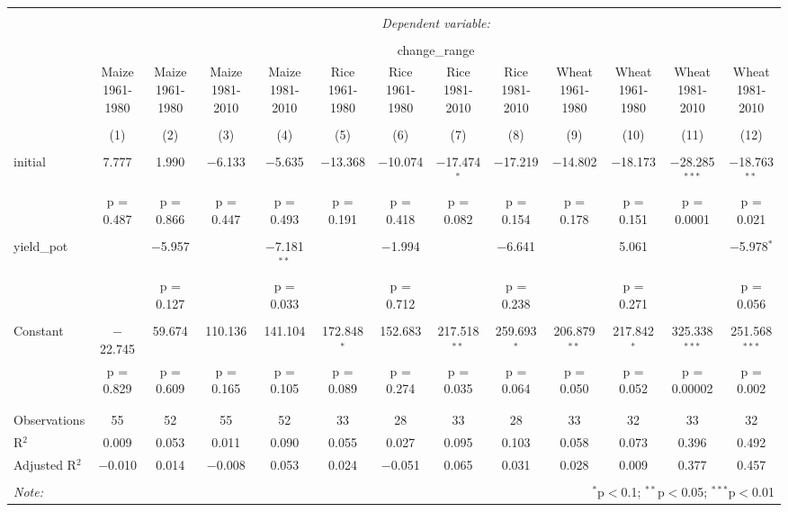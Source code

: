 
\begin{table}[!htbp] \centering 
  \caption{} 
  \label{} 
\begin{tabular}{@{\extracolsep{5pt}}lcccccccccccc} 
\\[-1.8ex]\hline 
\hline \\[-1.8ex] 
 & \multicolumn{12}{c}{\textit{Dependent variable:}} \\ 
\cline{2-13} 
\\[-1.8ex] & \multicolumn{12}{c}{change\_range} \\ 
 & Maize 1961-1980 & Maize 1961-1980 & Maize 1981-2010 & Maize 1981-2010 & Rice 1961-1980 & Rice 1961-1980 & Rice 1981-2010 & Rice 1981-2010 & Wheat 1961-1980 & Wheat 1961-1980 & Wheat 1981-2010 & Wheat 1981-2010 \\ 
\\[-1.8ex] & (1) & (2) & (3) & (4) & (5) & (6) & (7) & (8) & (9) & (10) & (11) & (12)\\ 
\hline \\[-1.8ex] 
 initial & 7.777 & 1.990 & $-$6.133 & $-$5.635 & $-$13.368 & $-$10.074 & $-$17.474$^{*}$ & $-$17.219 & $-$14.802 & $-$18.173 & $-$28.285$^{***}$ & $-$18.763$^{**}$ \\ 
  & p = 0.487 & p = 0.866 & p = 0.447 & p = 0.493 & p = 0.191 & p = 0.418 & p = 0.082 & p = 0.154 & p = 0.178 & p = 0.151 & p = 0.0001 & p = 0.021 \\ 
  & & & & & & & & & & & & \\ 
 yield\_pot &  & $-$5.957 &  & $-$7.181$^{**}$ &  & $-$1.994 &  & $-$6.641 &  & 5.061 &  & $-$5.978$^{*}$ \\ 
  &  & p = 0.127 &  & p = 0.033 &  & p = 0.712 &  & p = 0.238 &  & p = 0.271 &  & p = 0.056 \\ 
  & & & & & & & & & & & & \\ 
 Constant & $-$22.745 & 59.674 & 110.136 & 141.104 & 172.848$^{*}$ & 152.683 & 217.518$^{**}$ & 259.693$^{*}$ & 206.879$^{**}$ & 217.842$^{*}$ & 325.338$^{***}$ & 251.568$^{***}$ \\ 
  & p = 0.829 & p = 0.609 & p = 0.165 & p = 0.105 & p = 0.089 & p = 0.274 & p = 0.035 & p = 0.064 & p = 0.050 & p = 0.052 & p = 0.00002 & p = 0.002 \\ 
  & & & & & & & & & & & & \\ 
\hline \\[-1.8ex] 
Observations & 55 & 52 & 55 & 52 & 33 & 28 & 33 & 28 & 33 & 32 & 33 & 32 \\ 
R$^{2}$ & 0.009 & 0.053 & 0.011 & 0.090 & 0.055 & 0.027 & 0.095 & 0.103 & 0.058 & 0.073 & 0.396 & 0.492 \\ 
Adjusted R$^{2}$ & $-$0.010 & 0.014 & $-$0.008 & 0.053 & 0.024 & $-$0.051 & 0.065 & 0.031 & 0.028 & 0.009 & 0.377 & 0.457 \\ 
\hline 
\hline \\[-1.8ex] 
\textit{Note:}  & \multicolumn{12}{r}{$^{*}$p$<$0.1; $^{**}$p$<$0.05; $^{***}$p$<$0.01} \\ 
\end{tabular} 
\end{table} 
